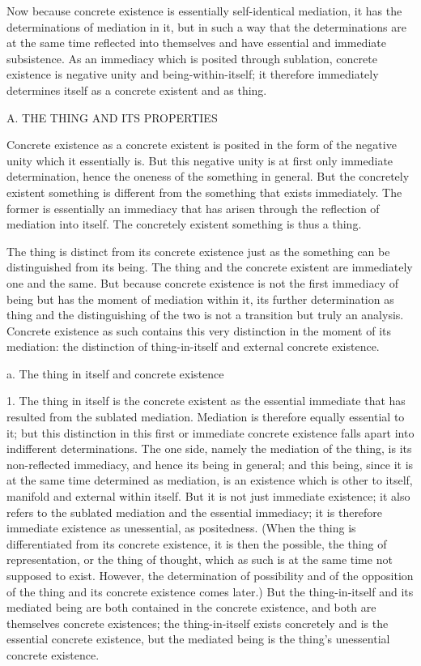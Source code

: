 Now because concrete existence is
essentially self-identical mediation,
it has the determinations of mediation in it,
but in such a way that the determinations are
at the same time reflected into themselves
and have essential and immediate subsistence.
As an immediacy which is posited through sublation,
concrete existence is negative unity and being-within-itself;
it therefore immediately determines itself
as a concrete existent and as thing.

A. THE THING AND ITS PROPERTIES

Concrete existence as a concrete existent is posited in
the form of the negative unity which it essentially is.
But this negative unity is at first only immediate determination,
hence the oneness of the something in general.
But the concretely existent something is different
from the something that exists immediately.
The former is essentially an immediacy that has arisen
through the reflection of mediation into itself.
The concretely existent something is thus a thing.

The thing is distinct from its concrete existence
just as the something can be distinguished from its being.
The thing and the concrete existent
are immediately one and the same.
But because concrete existence is not
the first immediacy of being
but has the moment of mediation within it,
its further determination as thing
and the distinguishing of the two is
not a transition but truly an analysis.
Concrete existence as such contains
this very distinction in the moment of its mediation:
the distinction of thing-in-itself 
and external concrete existence.

a. The thing in itself and concrete existence

1. The thing in itself is the concrete existent
as the essential immediate that has resulted
from the sublated mediation.
Mediation is therefore equally essential to it;
but this distinction in this first or immediate concrete
existence falls apart into indifferent determinations.
The one side, namely the mediation of the thing,
is its non-reflected immediacy,
and hence its being in general;
and this being, since it is at the same time determined as mediation,
is an existence which is other to itself,
manifold and external within itself.
But it is not just immediate existence;
it also refers to the sublated mediation
and the essential immediacy;
it is therefore immediate existence
as unessential, as positedness.
(When the thing is differentiated from its concrete existence, 
it is then the possible, the thing of representation,
or the thing of thought,
which as such is at the same time not supposed to exist.
However, the determination of possibility
and of the opposition of the thing
and its concrete existence comes later.)
But the thing-in-itself and its mediated being are
both contained in the concrete existence,
and both are themselves concrete existences;
the thing-in-itself exists concretely
and is the essential concrete existence,
but the mediated being is
the thing's unessential concrete existence.

